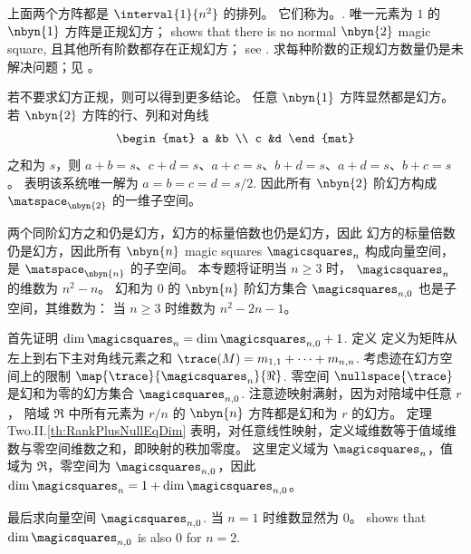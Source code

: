 上面两个方阵都是 $\interval{1}{n^2}$ 的排列。
它们称为。.
唯一元素为 $1$ 的 $\nbyn{1}$ 方阵是正规幻方；
 shows that there is
no normal $\nbyn{2}$ magic square,
且其他所有阶数都存在正规幻方；
see \cite{WikipediaMagicSquare}.
求每种阶数的正规幻方数量仍是未解决问题；见 \cite{OnlineEncyclopedia}。
 
若不要求幻方正规，则可以得到更多结论。
任意 $\nbyn{1}$ 方阵显然都是幻方。
若 $\nbyn{2}$ 方阵的行、列和对角线
\begin{equation*}
  \begin{mat}
    a  &b  \\
    c  &d
  \end{mat}
\end{equation*}
之和为 $s$，则 $a+b=s$、$c+d=s$、$a+c=s$、$b+d=s$、$a+d=s$、$b+c=s$。
 表明该系统唯一解为 $a=b=c=d=s/2$.
因此所有 $\nbyn{2}$ 阶幻方构成 $\matspace_{\nbyn{2}}$ 的一维子空间。

两个同阶幻方之和仍是幻方，幻方的标量倍数也仍是幻方，因此
幻方的标量倍数仍是幻方，因此所有
$\nbyn{n}$ magic squares
$\magicsquares_n$ 构成向量空间，是 $\matspace_{\nbyn{n}}$ 的子空间。
本专题将证明当 $n\geq 3$ 时，
$\magicsquares_n$ 的维数为 $n^2-n$。
幻和为 $0$ 的 $\nbyn{n}$ 阶幻方集合 $\magicsquares_{n,0}$ 
也是子空间，其维数为：
当 $n\geq 3$ 时维数为 $n^2-2n-1$。

首先证明 $\dim\magicsquares_n=\dim\magicsquares_{n,0}+1$.
定义
 定义为矩阵从左上到右下主对角线元素之和
$\trace (M)=m_{1,1}+\cdots+m_{n,n}$.
考虑迹在幻方空间上的限制
$\map{\trace}{\magicsquares_n}{\Re}$. 
零空间 $\nullspace{\trace}$ 是幻和为零的幻方集合
$\magicsquares_{n,0}$.
注意迹映射满射，因为对陪域中任意 $r$，
陪域 $\Re$ 中所有元素为 $r/n$ 的 $\nbyn{n}$ 方阵都是幻和为 $r$ 的幻方。
定理 Two.II.\ref{th:RankPlusNullEqDim} 表明，对任意线性映射，定义域维数等于值域维数与零空间维数之和，即映射的秩加零度。
这里定义域为 $\magicsquares_n$，值域为 $\Re$，零空间为 $\magicsquares_{n,0}$，因此 $\dim\magicsquares_n=1+\dim\magicsquares_{n,0}$。

最后求向量空间
$\magicsquares_{n,0}$. 
当 $n=1$ 时维数显然为 $0$。
 shows 
that $\dim\magicsquares_{n,0}$ is also $0$
for $n=2$.

